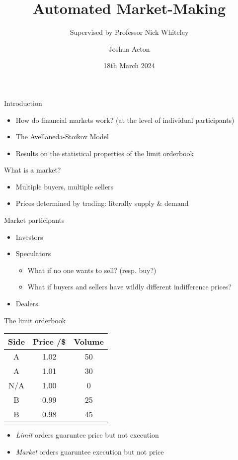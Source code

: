 \documentclass{beamer} %
\title{Automated Market-Making}
\author{Joshua Acton}
\date{18th March 2024}
\subtitle{Supervised by Professor Nick Whiteley}
\begin{document}
\begin{frame}
    \titlepage
\end{frame}

\begin{frame}{Introduction}
    \begin{itemize}
    \item How do financial markets work? (at the level of individual participants)
    \item The Avellaneda-Stoikov Model
    \item Results on the statistical properties of the limit orderbook
    \end{itemize}
\end{frame}

\begin{frame}{What is a market?}
    \begin{itemize}
        \item Multiple buyers, multiple sellers
        \item Prices determined by trading: literally supply \& demand
    \end{itemize}
\end{frame}

\begin{frame}{Market participants}
    \begin{itemize}
        \item Investors
        \item Speculators
        \begin{itemize}
            \item What if no one wants to sell? (resp. buy?)
            \item What if buyers and sellers have wildly different indifference prices?
        \end{itemize}
        \item Dealers
    \end{itemize}
\end{frame}

\begin{frame}{The limit orderbook}
    \begin{center}
        \begin{tabular}{ |c|c|c| } 
            \hline
            Side & Price /\$ & Volume \\ 
            \hline
            A & 1.02 & 50 \\
            A & 1.01 & 30 \\
            N/A & 1.00 & 0 \\
            B & 0.99 & 25 \\ 
            B & 0.98 & 45 \\
            \hline
        \end{tabular}
    \end{center}
    \begin{itemize}
        \item \emph{Limit} orders guaruntee price but not execution
        \item \emph{Market} orders guaruntee execution but not price
    \end{itemize}
\end{frame}
\end{document}
